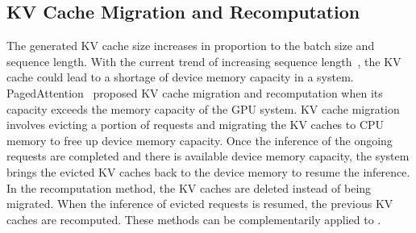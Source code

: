 \subsection{KV Cache Migration and Recomputation}
\label{sec:discussion:kvcache}
The generated KV cache size increases in proportion to the batch size and sequence length. 
With the current trend of increasing sequence length~\cite{cal-2023-attacc}, the KV cache could lead to a shortage of device memory capacity in a system. 
PagedAttention~\cite{sosp-2023-pagedattention} proposed KV cache migration and recomputation when its capacity exceeds the memory capacity of the GPU system.
KV cache migration involves evicting a portion of requests and migrating the KV caches to CPU memory to free up device memory capacity.
Once the inference of the ongoing requests are completed and there is available device memory capacity, the system brings the evicted KV caches back to the device memory to resume the inference. 
In the recomputation method, the KV caches are deleted instead of being migrated.
When the inference of evicted requests is resumed, the previous KV caches are recomputed.
These methods can be complementarily applied to \duplex.



